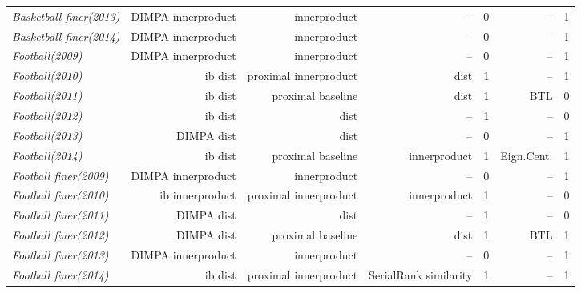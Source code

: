 \documentclass[nohyperref]{article}
\theoremstyle{plain}
\theoremstyle{definition}
\theoremstyle{remark}
\begin{document}
\begin{table*}[!ht]
{\begin{tabular}{lrrrrrr}
			{\it Basketball finer(2013)} & DIMPA innerproduct & innerproduct & -- & 0 & -- & 1 \\
			{\it Basketball finer(2014)} & DIMPA innerproduct & innerproduct & -- & 0 & -- & 1 \\
			{\it Football(2009)} & DIMPA innerproduct & innerproduct & -- & 0 & -- & 1 \\
			{\it Football(2010)} & ib dist & proximal innerproduct & dist & 1 & -- & 1 \\
			{\it Football(2011)} & ib dist & proximal baseline & dist & 1 & BTL & 0 \\
			{\it Football(2012)} & ib dist & dist & -- & 1 & -- & 0 \\
			{\it Football(2013)} & DIMPA dist & dist & -- & 0 & -- & 1 \\
			{\it Football(2014)} & ib dist & proximal baseline & innerproduct & 1 & Eign.Cent. & 1 \\
			{\it Football finer(2009)} & DIMPA innerproduct & innerproduct & -- & 0 & -- & 1 \\
			{\it Football finer(2010)} & ib innerproduct & proximal innerproduct & innerproduct & 1 & -- & 0 \\
			{\it Football finer(2011)} & DIMPA dist & dist & -- & 1 & -- & 0 \\
			{\it Football finer(2012)} & DIMPA dist & proximal baseline & dist & 1 & BTL & 1 \\
			{\it Football finer(2013)} & DIMPA innerproduct & innerproduct & -- & 0 & -- & 1 \\
			{\it Football finer(2014)} & ib dist & proximal innerproduct & SerialRank similarity & 1 & -- & 1 \\
\bottomrule
\end{tabular}}
\end{table*}
\end{document}
